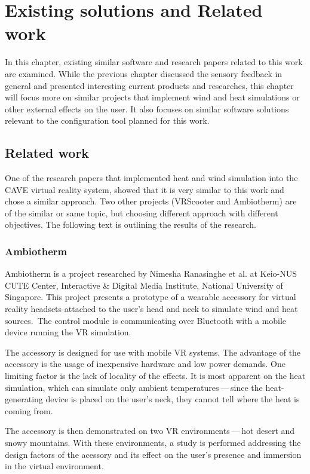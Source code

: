 \chapter{Existing solutions and Related work}\label{relatedwork}

In this chapter, existing similar software and research papers related to this
work are examined. While the previous chapter discussed the sensory feedback in
general and presented interesting current products and researches, this
chapter will focus more on similar projects that implement wind and heat simulations
or other external effects on the user. It also focuses on similar software
solutions relevant to the configuration tool planned for this work.


\hypertarget{x-related-work}{\section{Related work}}
One of the research papers that implemented heat and wind simulation into the
CAVE virtual reality system,
showed that it is very similar to this work and chose a similar approach. Two
other projects (VRScooter and Ambiotherm) are of the similar or same topic,
but choosing different approach with different objectives.
The following text is outlining the results of the research.


\hypertarget{x-ambiotherm}{\subsection{Ambiotherm}}
Ambiotherm is a project researched by Nimesha Ranasinghe et al. at Keio-NUS
CUTE Center, Interactive \& Digital Media Institute, National University of
Singapore. This project presents a prototype of a wearable accessory for virtual
reality headsets attached to the user’s head and neck to simulate wind
and heat sources.\,\cite{ambiotherm} 
The control module is communicating over Bluetooth with
a mobile device running the VR simulation.


The accessory is designed for use with mobile VR systems.
The advantage of the accessory is the usage of inexpensive hardware and low power
demands. One limiting factor is the lack of locality of the effects.
It is most apparent on the heat simulation, which can simulate
only ambient temperatures — since the heat-generating device is
placed on the user’s neck, they cannot tell where the heat is coming from.


The accessory is then demonstrated on two VR environments — hot desert and
snowy mountains. With these environments, a study is performed addressing the
design factors of the acessory and its effect on the user’s presence
and immersion in the virtual environment.


